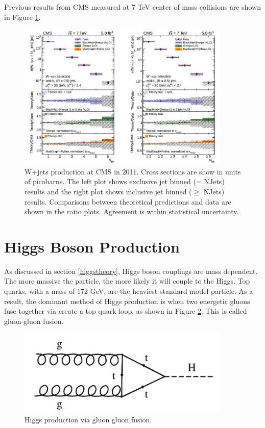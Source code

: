 \documentclass[oneside, letterpaper, oldfontcommands]{memoir}
\begin{document}
Previous results from CMS measured at 7 TeV center of mass collisions\cite{Khachatryan:2014uva} are shown in Figure \ref{fig:wjets7TeV}. 

\begin{figure}[here]
\includegraphics[width=0.9\textwidth]{wjets7TeV.jpg}
\caption{W+jets production at CMS in 2011. Cross sections are show in units of picobarns. The left plot shows exclusive jet binned (= NJets) results and the right plot shows inclusive jet binned ($\geq$ NJets) results. Comparisons between theoretical predictions and data are shown in the ratio plots. Agreement is within statistical uncertainty. }
\label{fig:wjets7TeV}
\end{figure}


\section{Higgs Boson Production}\label{higgspheno}
\qquad As discussed in section \ref{higgstheory}, Higgs boson couplings are mass dependent. The more massive the particle, the more likely it will couple to the Higgs. Top quarks, with a mass of 172 GeV, are the heaviest standard model particle. As a result, the dominant method of Higgs production is when two energetic gluons fuse together via create a top quark loop, as shown in Figure \ref{fig:ggfHiggs}. This is called gluon-gluon fusion.

\begin{figure}[here]
\includegraphics[width=0.9\textwidth]{ggfHiggs.jpg}
\caption{Higgs production via gluon gluon fusion.}
\label{fig:ggfHiggs}
\end{figure}
\end{document}
